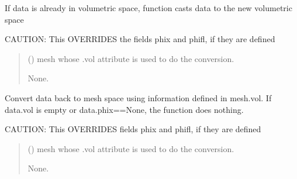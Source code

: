 \documentclass[letterpaper,10pt,english]{sphinxmanual}
\begin{document}
\begin{fulllineitems}
\begin{fulllineitems}
\sphinxAtStartPar
If data is already in volumetric space, function casts data to the new volumetric space

\sphinxAtStartPar
CAUTION: This OVERRIDES the fields phix and phifl, if they are defined
\begin{quote}\begin{description}
\sphinxAtStartPar
{} () \textendash{} mesh whose .vol attribute is used to do the conversion.

\sphinxAtStartPar
None.

\end{description}\end{quote}

\end{fulllineitems}


\begin{fulllineitems}
\label{\detokenize{_autosummary/nirfasterff.base.data.flTPSFdata:nirfasterff.base.data.flTPSFdata.tomesh}}
\pysigstartsignatures
{}
\pysigstopsignatures
\sphinxAtStartPar
Convert data back to mesh space using information defined in mesh.vol. If data.vol is empty or data.phix==None, the function does nothing.

\sphinxAtStartPar
CAUTION: This OVERRIDES fields phix and phifl, if they are defined
\begin{quote}\begin{description}
\sphinxAtStartPar
{} () \textendash{} mesh whose .vol attribute is used to do the conversion.

\sphinxAtStartPar
None.

\end{description}\end{quote}

\end{fulllineitems}


\end{fulllineitems}


\sphinxstepscope
\end{document}
